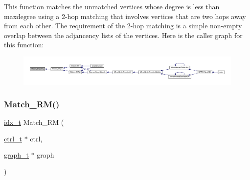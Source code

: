 This function matches the unmatched vertices whose degree is less than maxdegree using a 2-\/hop matching that involves vertices that are two hops away from each other. The requirement of the 2-\/hop matching is a simple non-\/empty overlap between the adjancency lists of the vertices. Here is the caller graph for this function\+:\nopagebreak
\begin{figure}[H]
\begin{center}
\leavevmode
\includegraphics[width=350pt]{a00182_a838a4013e3b5cc5278ecc7a8757ce0ef_icgraph}
\end{center}
\end{figure}
\mbox{\label{a00182_a892d2ea16d613abc2276ad5fc6999724}} 
\subsubsection{\texorpdfstring{Match\+\_\+\+R\+M()}{Match\_RM()}}
{\footnotesize\ttfamily \hyperlink{a00876_aaa5262be3e700770163401acb0150f52}{idx\+\_\+t} Match\+\_\+\+RM (\begin{DoxyParamCaption}\item[{\hyperlink{a00742}{ctrl\+\_\+t} $\ast$}]{ctrl,  }\item[{\hyperlink{a00734}{graph\+\_\+t} $\ast$}]{graph }\end{DoxyParamCaption})}

